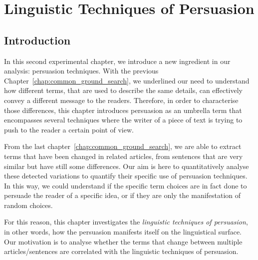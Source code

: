 \chapter{\statusgreen Linguistic Techniques of Persuasion}
\label{chap:linguistic_persuasion}

\section{\statusgreen Introduction}
\label{sec:lp_intro}

In this second experimental chapter, we introduce a new ingredient in our analysis: persuasion techniques.
With the previous Chapter~\ref{chap:common_ground_search}, we underlined our need to understand how different terms, that are used to describe the same details, can effectively convey a different message to the readers.
Therefore, in order to characterise those differences, this chapter introduces \gls{persuasion} as an umbrella term that encompasses several techniques where the writer of a piece of text is trying to push to the reader a certain point of view.

From the last chapter~\ref{chap:common_ground_search}, 
we are able to extract terms that have been changed in related articles, from sentences that are very similar but have still some differences.
Our aim is here to quantitatively analyse these detected variations to quantify their specific use of persuasion techniques.
In this way, we could understand if the specific term choices are in fact done to persuade the reader of a specific idea, or if they are only the manifestation of random choices.

For this reason, this chapter investigates the \emph{linguistic techniques of persuasion}, in other words, how the persuasion manifests itself on the linguistical surface.
Our motivation is to analyse whether the terms that change between multiple articles/sentences are correlated with the linguistic techniques of persuasion.

